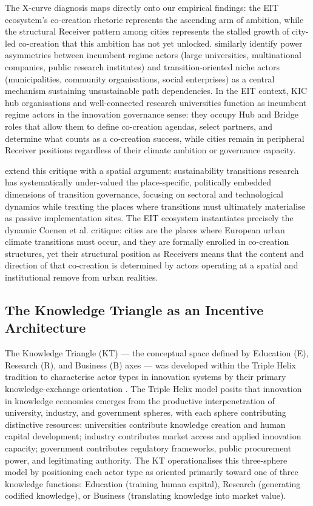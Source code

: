 \documentclass[review,12pt]{elsarticle}
\begin{document}
The X-curve diagnosis maps directly onto our empirical findings: the EIT ecosystem's co-creation rhetoric represents the ascending arm of ambition, while the structural Receiver pattern among cities represents the stalled growth of city-led co-creation that this ambition has not yet unlocked. \citet{loorbach2017sustainability} similarly identify power asymmetries between incumbent regime actors (large universities, multinational companies, public research institutes) and transition-oriented niche actors (municipalities, community organisations, social enterprises) as a central mechanism sustaining unsustainable path dependencies. In the EIT context, KIC hub organisations and well-connected research universities function as incumbent regime actors in the innovation governance sense: they occupy Hub and Bridge roles that allow them to define co-creation agendas, select partners, and determine what counts as a co-creation success, while cities remain in peripheral Receiver positions regardless of their climate ambition or governance capacity.

\citet{coenen2012place} extend this critique with a spatial argument: sustainability transitions research has systematically under-valued the place-specific, politically embedded dimensions of transition governance, focusing on sectoral and technological dynamics while treating the places where transitions must ultimately materialise as passive implementation sites. The EIT ecosystem instantiates precisely the dynamic Coenen et al. critique: cities are the places where European urban climate transitions must occur, and they are formally enrolled in co-creation structures, yet their structural position as Receivers means that the content and direction of that co-creation is determined by actors operating at a spatial and institutional remove from urban realities.

\subsection{The Knowledge Triangle as an Incentive Architecture}

The Knowledge Triangle (KT) --- the conceptual space defined by Education (E), Research (R), and Business (B) axes --- was developed within the Triple Helix tradition to characterise actor types in innovation systems by their primary knowledge-exchange orientation \citep{etzkowitz2000dynamics, ranga2013triple}. The Triple Helix model posits that innovation in knowledge economies emerges from the productive interpenetration of university, industry, and government spheres, with each sphere contributing distinctive resources: universities contribute knowledge creation and human capital development; industry contributes market access and applied innovation capacity; government contributes regulatory frameworks, public procurement power, and legitimating authority. The KT operationalises this three-sphere model by positioning each actor type as oriented primarily toward one of three knowledge functions: Education (training human capital), Research (generating codified knowledge), or Business (translating knowledge into market value).
\end{document}

